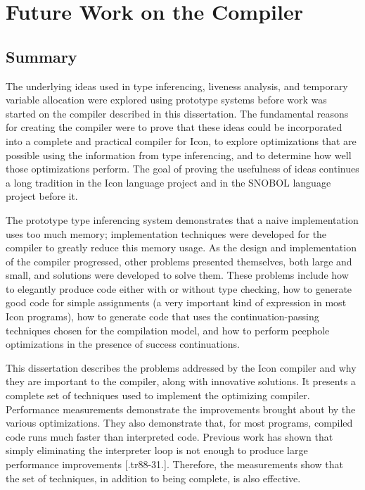 \chapter{Future Work on the Compiler}

\section{Summary}

The underlying ideas used in type inferencing, liveness analysis, and
temporary variable allocation were explored using prototype systems
before work was started on the compiler described in this
dissertation. The fundamental reasons for creating the compiler were
to prove that these ideas could be incorporated into a complete and
practical compiler for Icon, to explore optimizations that are
possible using the information from type inferencing, and to determine
how well those optimizations perform. The goal of proving the
usefulness of ideas continues a long tradition in the Icon language
project and in the SNOBOL language project before it.

The prototype type inferencing system demonstrates that a naive
implementation uses too much memory; implementation techniques were
developed for the compiler to greatly reduce this memory usage. As the
design and implementation of the compiler progressed, other problems
presented themselves, both large and small, and solutions were
developed to solve them. These problems include how to elegantly
produce code either with or without type checking, how to generate
good code for simple assignments (a very important kind of expression
in most Icon programs), how to generate code that uses the
continuation-passing techniques chosen for the compilation model, and
how to perform peephole optimizations in the presence of success
continuations.

This dissertation describes the problems addressed by the Icon
compiler and why they are important to the compiler, along with
innovative solutions. It presents a complete set of techniques used to
implement the optimizing compiler.  Performance measurements
demonstrate the improvements brought about by the various
optimizations. They also demonstrate that, for most programs, compiled
code runs much faster than interpreted code. Previous work has shown
that simply eliminating the interpreter loop is not enough to produce
large performance improvements [.tr88-31.]. Therefore, the
measurements show that the set of techniques, in addition to being
complete, is also effective.


